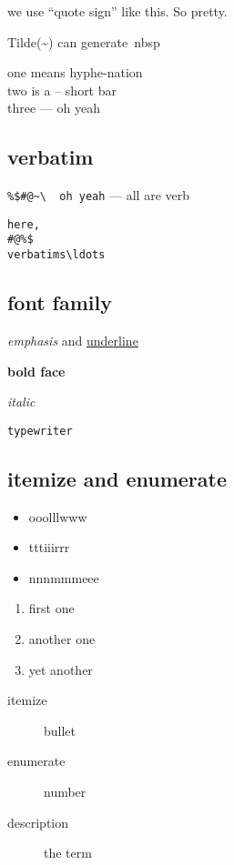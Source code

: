 \documentclass[a4paper,12pt]{article}
\begin{document}
we use ``quote sign'' like this. So pretty.

Tilde(\~{}) can generate~nbsp

one means hyphe-nation\\
two is a -- short bar\\
three --- oh yeah\\

\subsection{verbatim}

\verb|%$#@~\  oh yeah| --- all are verb

\begin{verbatim}
here,
#@%$
verbatims\ldots
\end{verbatim}

\subsection{font family}

\emph{emphasis} and \underline{underline}

\textbf{bold face}

\textit{italic}

\texttt{typewriter}

\subsection{itemize and enumerate}

\begin{itemize}
	\item ooolllwww
	\item tttiiirrr
	\item nnnmmmeee
\end{itemize}

\begin{enumerate}
	\item first one
	\item another one
	\item yet another
\end{enumerate}

\begin{description}
	\item[itemize] bullet
	\item[enumerate] number
	\item[description] the term
\end{description}
\end{document}
